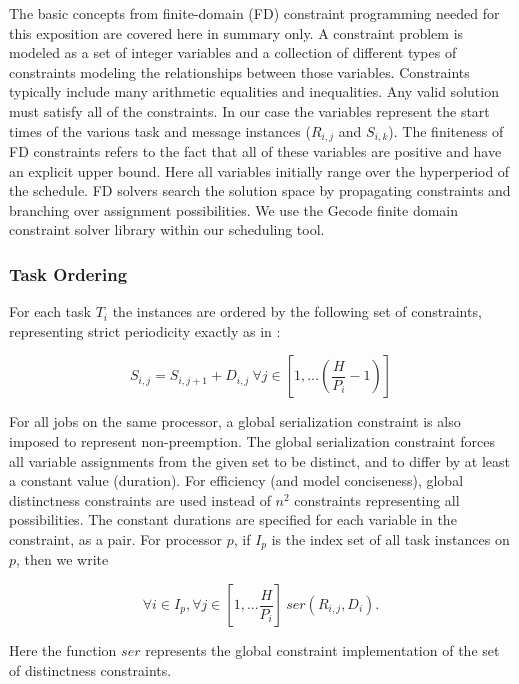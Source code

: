 The basic concepts from finite-domain (FD) constraint programming needed for this exposition are covered here in summary only.  A constraint problem is modeled as a set of integer variables and a collection of different types of constraints modeling the relationships between those variables.  Constraints typically include many arithmetic equalities and inequalities. Any valid solution must satisfy all of the constraints. In our case the variables represent the start times of the various task and message instances ($R_{i,j}$ and $S_{i,k}$).  The finiteness of FD constraints refers to the fact that all of these variables are positive and have an explicit upper bound.  Here all variables initially range over the hyperperiod of the schedule.  FD solvers search the solution space by propagating constraints and branching over assignment possibilities.  We use the Gecode finite domain constraint solver library\cite{tools:gecode} within our scheduling tool.

\subsubsection{Task Ordering}

For each task $T_i$ the instances are ordered by the following set of constraints, representing strict periodicity exactly as in \cite{sched:offline}:

\begin{equation}
S_{i,j}  = S_{i,j+1} + D_{i,j}\ \forall j \in [1,...(\frac{H}{{P_i}}-1)]
\end{equation}
	  
For all jobs on the same processor, a global serialization constraint is also imposed to represent non-preemption.  The global serialization constraint forces all variable assignments from the given set to be distinct, and to differ by at least a constant value (duration).  For efficiency (and model conciseness), global distinctness constraints are used instead of $n^2$ constraints representing all possibilities\cite{sched:cumulatives,sched:offline}.  The constant durations are specified for each variable in the constraint, as a pair.  For processor $p$, if $I_p$ is the index set of all task instances on $p$, then we write

\begin{equation}
\forall i \in I_p ,\forall j \in [1,...\frac{H}{{P_i}}]\ ser(R_{i,j}, D_i ).
\end{equation}

Here the function $ser$ represents the global constraint implementation of the set of distinctness constraints.

